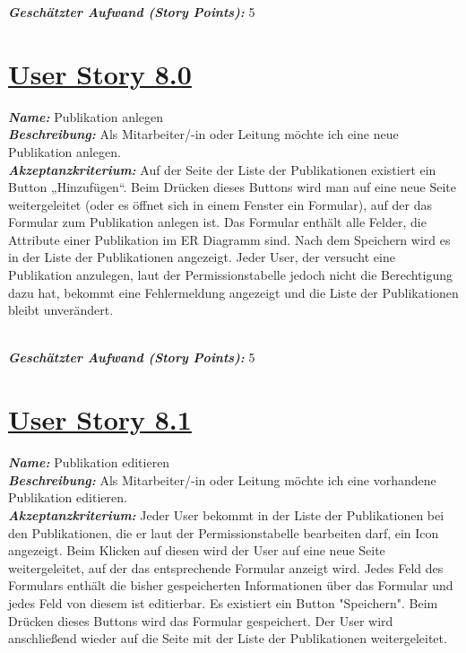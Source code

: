 \documentclass[12pt]{article}%
\begin{document}
\textbf{\textit{Geschätzter Aufwand (Story Points):}} 5
\\

\section*{\large \underline{User Story 8.0}}
\textit{\textbf{Name:}} Publikation anlegen
\\

\textbf{\textit{Beschreibung:}} Als Mitarbeiter/-in  oder Leitung möchte ich eine neue Publikation anlegen.
\\

\textbf{\textit{Akzeptanzkriterium:}} Auf der Seite der Liste der Publikationen existiert ein Button „Hinzufügen“. Beim Drücken dieses Buttons wird man auf eine neue Seite weitergeleitet (oder es öffnet sich in einem Fenster ein Formular), auf der das Formular zum Publikation anlegen ist. Das Formular enthält alle Felder, die Attribute einer Publikation im ER Diagramm sind. Nach dem Speichern wird es in der Liste der Publikationen angezeigt. Jeder User, der versucht eine Publikation anzulegen, laut der Permissionstabelle jedoch nicht die Berechtigung dazu hat, bekommt eine Fehlermeldung angezeigt und die Liste der Publikationen bleibt unverändert.

\\

\textbf{\textit{Geschätzter Aufwand (Story Points):}} 5
\\


\section*{\large \underline{User Story 8.1}}
\textit{\textbf{Name:}} Publikation editieren
\\

\textbf{\textit{Beschreibung:}} Als Mitarbeiter/-in  oder Leitung möchte ich eine vorhandene Publikation editieren.
\\

\textbf{\textit{Akzeptanzkriterium:}} Jeder User bekommt in der Liste der Publikationen bei den Publikationen, die er laut der Permissionstabelle bearbeiten darf, ein Icon angezeigt. Beim Klicken auf diesen wird der User auf eine neue Seite weitergeleitet, auf der das entsprechende Formular anzeigt wird. Jedes Feld des Formulars enthält die bisher gespeicherten Informationen über das Formular und jedes Feld von diesem ist editierbar. Es existiert ein Button "Speichern". Beim Drücken dieses Buttons wird das Formular gespeichert. Der User wird anschließend wieder auf die Seite mit der Liste der Publikationen weitergeleitet.
\end{document}
